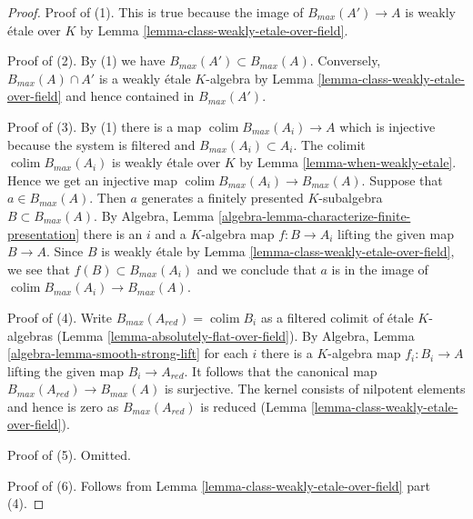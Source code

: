 \documentclass[10pt,a4paper]{amsart}
\theoremstyle{plain}
\theoremstyle{definition}
\theoremstyle{remark}
\numberwithin{equation}{subsection}
\def\colim{\mathop{\mathrm{colim}}\nolimits}
\begin{document}
\begin{proof}
Proof of (1). This is true because the image of $B_{max}(A') \to A$
is weakly \'etale over $K$ by Lemma \ref{lemma-class-weakly-etale-over-field}.

\medskip\noindent
Proof of (2). By (1) we have $B_{max}(A') \subset B_{max}(A)$.
Conversely, $B_{max}(A) \cap A'$ is a weakly \'etale $K$-algebra
by Lemma \ref{lemma-class-weakly-etale-over-field} and hence
contained in $B_{max}(A')$.

\medskip\noindent
Proof of (3). By (1) there is a map $\colim B_{max}(A_i) \to A$
which is injective because the system is filtered and
$B_{max}(A_i) \subset A_i$. The colimit $\colim B_{max}(A_i)$
is weakly \'etale over $K$ by
Lemma \ref{lemma-when-weakly-etale}.
Hence we get an injective map $\colim B_{max}(A_i) \to B_{max}(A)$.
Suppose that $a \in B_{max}(A)$. Then $a$ generates a finitely presented
$K$-subalgebra $B \subset B_{max}(A)$.
By Algebra, Lemma \ref{algebra-lemma-characterize-finite-presentation}
there is an $i$ and a $K$-algebra map $f : B \to A_i$
lifting the given map $B \to A$.
Since $B$ is weakly \'etale by
Lemma \ref{lemma-class-weakly-etale-over-field},
we see that $f(B) \subset B_{max}(A_i)$ and we conclude that $a$
is in the image of $\colim B_{max}(A_i) \to B_{max}(A)$.

\medskip\noindent
Proof of (4). Write $B_{max}(A_{red}) = \colim B_i$
as a filtered colimit of \'etale $K$-algebras
(Lemma \ref{lemma-absolutely-flat-over-field}).
By Algebra, Lemma \ref{algebra-lemma-smooth-strong-lift}
for each $i$ there is a $K$-algebra map $f_i : B_i \to A$
lifting the given map $B_i \to A_{red}$. It follows that the
canonical map $B_{max}(A_{red}) \to B_{max}(A)$ is surjective.
The kernel consists of nilpotent elements and hence is zero
as $B_{max}(A_{red})$ is reduced
(Lemma \ref{lemma-class-weakly-etale-over-field}).

\medskip\noindent
Proof of (5). Omitted.

\medskip\noindent
Proof of (6). Follows from Lemma \ref{lemma-class-weakly-etale-over-field}
part (4).
\end{proof}
\end{document}
